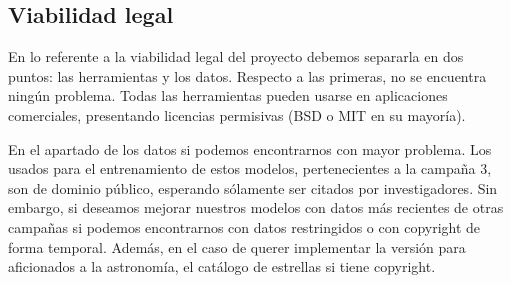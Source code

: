 \subsection{Viabilidad legal}

En lo referente a la viabilidad legal del proyecto debemos separarla en dos puntos: las herramientas y los datos. Respecto a las primeras, no se encuentra ningún problema. Todas las herramientas pueden usarse en aplicaciones comerciales, presentando licencias permisivas (BSD o MIT en su mayoría).

En el apartado de los datos si podemos encontrarnos con mayor problema. Los usados para el entrenamiento de estos modelos, pertenecientes a la campaña 3, son de dominio público, esperando sólamente ser citados por investigadores. Sin embargo, si deseamos mejorar nuestros modelos con datos más recientes de otras campañas si podemos encontrarnos con datos restringidos o con copyright de forma temporal. Además, en el caso de querer implementar la versión para aficionados a la astronomía, el catálogo de estrellas si tiene copyright.
